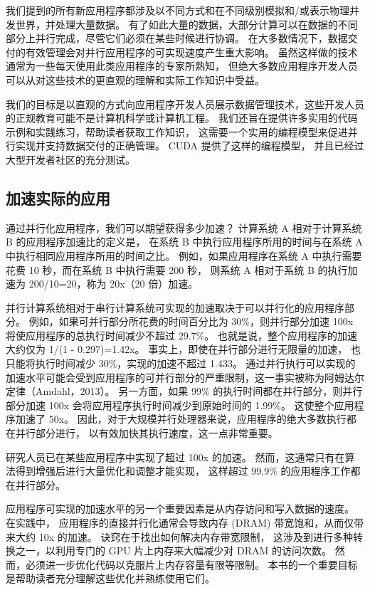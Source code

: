 我们提到的所有新应用程序都涉及以不同方式和在不同级别模拟和/或表示物理并发世界，并处理大量数据。 
有了如此大量的数据，大部分计算可以在数据的不同部分上并行完成，尽管它们必须在某些时候进行协调。 
在大多数情况下，数据交付的有效管理会对并行应用程序的可实现速度产生重大影响。 
虽然这样做的技术通常为一些每天使用此类应用程序的专家所熟知，
但绝大多数应用程序开发人员可以从对这些技术的更直观的理解和实际工作知识中受益。

我们的目标是以直观的方式向应用程序开发人员展示数据管理技术，这些开发人员的正规教育可能不是计算机科学或计算机工程。 
我们还旨在提供许多实用的代码示例和实践练习，帮助读者获取工作知识，
这需要一个实用的编程模型来促进并行实现并支持数据交付的正确管理。 CUDA 提供了这样的编程模型，
并且已经过大型开发者社区的充分测试。

\subsection{加速实际的应用}
通过并行化应用程序，我们可以期望获得多少加速？ 计算系统 A 相对于计算系统 B 的应用程序加速比的定义是，
在系统 B 中执行应用程序所用的时间与在系统 A 中执行相同应用程序所用的时间之比。
例如，如果应用程序在系统 A 中执行需要花费 10 秒，而在系统 B 中执行需要 200 秒，
则系统 A 相对于系统 B 的执行加速为 200/10=20，称为 20x（20 倍）加速。

并行计算系统相对于串行计算系统可实现的加速取决于可以并行化的应用程序部分。 
例如，如果可并行部分所花费的时间百分比为 30\%，则并行部分加速 100x 将使应用程序的总执行时间减少不超过 29.7\%。 
也就是说，整个应用程序的加速大约仅为 1/(1 - 0.297)=1.42x。 事实上，即使在并行部分进行无限量的加速，
也只能将执行时间减少 30\%，实现的加速不超过 1.433。 
通过并行执行可以实现的加速水平可能会受到应用程序的可并行部分的严重限制，这一事实被称为阿姆达尔定律（Amdahl，2013）。 
另一方面，如果 99\% 的执行时间都在并行部分，则并行部分加速 100x 会将应用程序执行时间减少到原始时间的 1.99\%。 
这使整个应用程序加速了 50x。 因此，对于大规模并行处理器来说，应用程序的绝大多数执行都在并行部分进行，
以有效加快其执行速度，这一点非常重要。

研究人员已在某些应用程序中实现了超过 100x 的加速。 然而，这通常只有在算法得到增强后进行大量优化和调整才能实现，
这样超过 99.9\% 的应用程序工作都在并行部分。

应用程序可实现的加速水平的另一个重要因素是从内存访问和写入数据的速度。 在实践中，
应用程序的直接并行化通常会导致内存 (DRAM) 带宽饱和，从而仅带来大约 10x 的加速。 诀窍在于找出如何解决内存带宽限制，
这涉及到进行多种转换之一，以利用专门的 GPU 片上内存来大幅减少对 DRAM 的访问次数。 
然而，必须进一步优化代码以克服片上内存容量有限等限制。 本书的一个重要目标是帮助读者充分理解这些优化并熟练使用它们。

